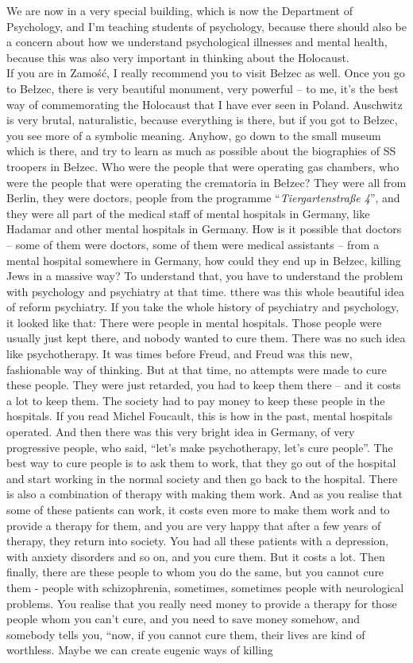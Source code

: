 We are now in a very special building, which is now the Department of Psychology, and I’m teaching students of psychology, because there should also be a concern about how we understand psychological illnesses and mental health, because this was also very important in thinking about the Holocaust.\\ If you are in Zamość, I really recommend you to visit Bełzec as well. Once you go to Bełzec, there is very beautiful monument, very powerful – to me, it’s the best way of commemorating the Holocaust that I have ever seen in Poland. Auschwitz is very brutal, naturalistic, because everything is there, but if you got to Bełzec, you see more of a symbolic meaning. Anyhow, go down to the small museum which is there, and try to learn as much as possible about the biographies of SS troopers in Bełzec. Who were the people that were operating gas chambers, who were the people that were operating the crematoria in Bełzec? They were all from Berlin, they were doctors, people from the programme ``\textit{Tiergartenstraße 4}'', and they were all part of the medical staff of mental hospitals in Germany, like Hadamar and other mental hospitals in Germany. How is it possible that doctors – some of them were doctors, some of them were medical assistants – from a mental hospital somewhere in Germany, how could they end up in Bełzec, killing Jews in a massive way? To understand that, you have to understand the problem with psychology and psychiatry at that time. tthere was this whole beautiful idea of reform psychiatry. If you take the whole history of psychiatry and psychology, it looked like that: There were people in mental hospitals. Those people were usually just kept there, and nobody wanted to cure them. There was no such idea like psychotherapy. It was times before Freud, and Freud was this new, fashionable way of thinking. But at that time, no attempts were made to cure these people. They were just retarded, you had to keep them there – and it costs a lot to keep them. The society had to pay money to keep these people in the hospitals. If you read Michel Foucault, this is how in the past, mental hospitals operated. And then there was this very bright idea in Germany, of very progressive people, who said, ``let’s make psychotherapy, let’s cure people''. The best way to cure people is to ask them to work, that they go out of the hospital and start working in the normal society and then go back to the hospital. There is also a combination of therapy with making them work. And as you realise that some of these patients can work, it costs even more to make them work and to provide a therapy for them, and you are very happy that after a few years of therapy, they return into society. You had all these patients with a depression, with anxiety disorders and so on, and you cure them. But it costs a lot. Then finally, there are these people to whom you do the same, but you cannot cure them - people with schizophrenia, sometimes, sometimes people with neurological problems. You realise that you really need money to provide a therapy for those people whom you can’t cure, and you need to save money somehow, and somebody tells you, ``now, if you cannot cure them, their lives are kind of worthless. Maybe we can create eugenic ways of killing 